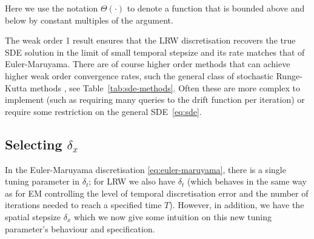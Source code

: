 \documentclass[pra,showpacs,amsmath,amssymb,amsfonts,lengthcheck,longbibliography,onecolumn]{revtex4-2}
\newcommand{\samd}[1]{{\color[RGB]{250, 0, 250}{SD: #1}}}
\newcommand{\rb}[1]{{\color[RGB]{0, 100, 150}{RB: #1}}}
\begin{document}
Here we use the notation $\Theta(\cdot)$ to denote a function that is bounded above and below
by constant multiples of the argument.

The weak order 1 result ensures that the LRW discretisation
recovers the true SDE solution in the limit of small temporal stepsize and its rate
matches that of Euler-Maruyama. There are of course higher order methods that can
achieve higher weak order convergence rates, such the general class of stochastic Runge-Kutta methods \cite{debrabant2008classification}, see Table~\ref{tab:sde-methods}.
Often these are more complex to implement (such as requiring many queries to the drift
function per iteration) or require some restriction on the general SDE~\eqref{eq:sde}.


\subsection{Selecting $\delta_x$}\label{subsec:dx_constraints}


In the Euler-Maruyama discretisation \eqref{eq:euler-maruyama}, there is a single tuning parameter in $\delta_t$; for LRW we also have $\delta_t$ (which behaves in the same way as for EM controlling the level of temporal discretisation error and the number of iterations needed to reach a specified time $T$). However, in addition, we have the spatial stepsize $\delta_x$ which we now give some intuition on this new tuning parameter's behaviour and specification.

\end{document}
